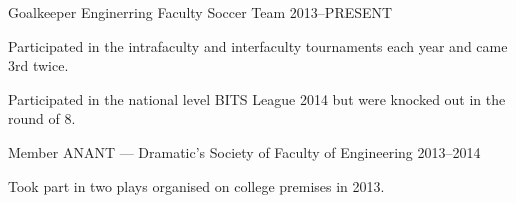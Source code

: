 \begin{cventries}
\cventry%
  {Goalkeeper} %
  {Enginerring Faculty Soccer Team} %
  {} %
  {2013--PRESENT} %
  {%
    \begin{cvitems} %
      \item{Participated in the intrafaculty and interfaculty tournaments each
            year and came 3rd twice.}
      \item{Participated in the national level BITS League 2014 but were
            knocked out in the round of 8.}
    \end{cvitems}
  }

\cventry%
  {Member} %
  {ANANT --- Dramatic's Society of Faculty of Engineering} %
  {} %
  {2013--2014} %
  {%
    \begin{cvitems} %
      \item{Took part in two plays organised on college premises in 2013.}
    \end{cvitems}
  }

\end{cventries}

